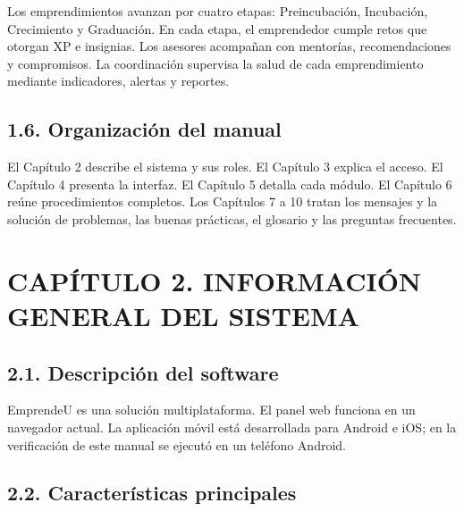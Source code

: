 \documentclass[12pt,letterpaper]{article}
\begin{document}

Los emprendimientos avanzan por cuatro etapas: Preincubación, Incubación, Crecimiento y Graduación. En cada etapa, el emprendedor cumple retos que otorgan XP e insignias. Los asesores acompañan con mentorías, recomendaciones y compromisos. La coordinación supervisa la salud de cada emprendimiento mediante indicadores, alertas y reportes.

\subsection*{1.6. Organización del manual}


El Capítulo 2 describe el sistema y sus roles. El Capítulo 3 explica el acceso. El Capítulo 4 presenta la interfaz. El Capítulo 5 detalla cada módulo. El Capítulo 6 reúne procedimientos completos. Los Capítulos 7 a 10 tratan los mensajes y la solución de problemas, las buenas prácticas, el glosario y las preguntas frecuentes.

\clearpage

\section*{CAPÍTULO 2. INFORMACIÓN GENERAL DEL SISTEMA}


\subsection*{2.1. Descripción del software}


EmprendeU es una solución multiplataforma. El panel web funciona en un navegador actual. La aplicación móvil está desarrollada para Android e iOS; en la verificación de este manual se ejecutó en un teléfono Android.

\subsection*{2.2. Características principales}

\end{document}
